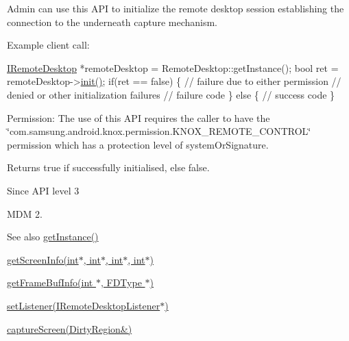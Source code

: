 \-Admin can use this \-A\-P\-I to initialize the remote desktop session establishing the connection to the underneath capture mechanism. 

\-Example client call\-:


\begin{DoxyPre}
  \hyperlink{classknoxremotedesktop_1_1IRemoteDesktop}{IRemoteDesktop} *remoteDesktop = RemoteDesktop::getInstance();
  bool ret = remoteDesktop->\hyperlink{classknoxremotedesktop_1_1IRemoteDesktop_a7bed40d98c61713a69cf1dad8b37beae}{init()};
  if(ret == false)  \{ // failure due to either permission 
                      // denied or other initialization failures
     // failure code
  \} else \{
     // success code
  \}
 \end{DoxyPre}


\begin{DoxyParagraph}{\-Permission\-: }
\-The use of this \-A\-P\-I requires the caller to have the \char`\"{}com.\-samsung.\-android.\-knox.\-permission.\-K\-N\-O\-X\-\_\-\-R\-E\-M\-O\-T\-E\-\_\-\-C\-O\-N\-T\-R\-O\-L\char`\"{} permission which has a protection level of system\-Or\-Signature.
\end{DoxyParagraph}
\begin{DoxyReturn}{\-Returns}
{\ttfamily true} if successfully initialised, else {\ttfamily false}. 
\end{DoxyReturn}
\begin{DoxySince}{\-Since}
\-A\-P\-I level 3 

\-M\-D\-M 2. 
\end{DoxySince}
\begin{DoxySeeAlso}{\-See also}
\hyperlink{classknoxremotedesktop_1_1IRemoteDesktop_a86eefbec946d605470af069999763f74}{get\-Instance()} 

\hyperlink{classknoxremotedesktop_1_1IRemoteDesktop_ae9a1e6863bfc2affad4462bc0a29914a}{get\-Screen\-Info(int$\ast$, int$\ast$, int$\ast$, int$\ast$)} 

\hyperlink{classknoxremotedesktop_1_1IRemoteDesktop_a57d5432823adfd7cfb72441469ccc98e}{get\-Frame\-Buf\-Info(int $\ast$, F\-D\-Type $\ast$)} 

\hyperlink{classknoxremotedesktop_1_1IRemoteDesktop_af22e75002f52d837cfc9d9589647ddb9}{set\-Listener(\-I\-Remote\-Desktop\-Listener$\ast$)} 

\hyperlink{classknoxremotedesktop_1_1IRemoteDesktop_a0ab5a0cf162a91c5e69abeed90f8ba09}{capture\-Screen(\-Dirty\-Region\&)} 
\end{DoxySeeAlso}
